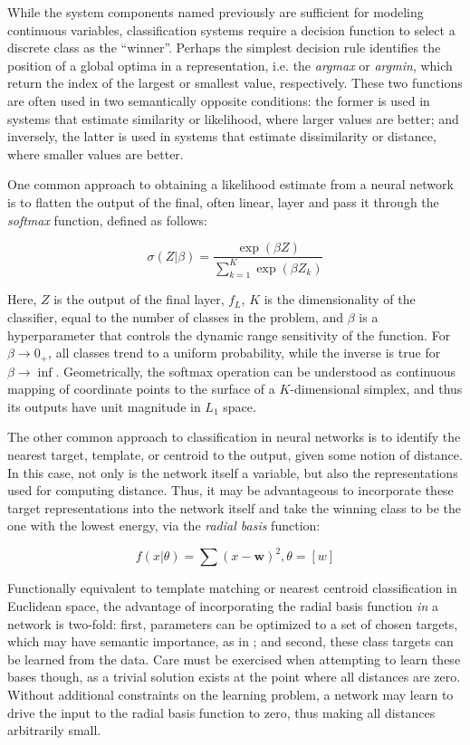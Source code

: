 While the system components named previously are sufficient for modeling continuous variables, classification systems require a decision function to select a discrete class as the ``winner''.
Perhaps the simplest decision rule identifies the position of a global optima in a representation, i.e. the \emph{argmax} or \emph{argmin}, which return the index of the largest or smallest value, respectively.
These two functions are often used in two semantically opposite conditions:
the former is used in systems that estimate similarity or likelihood, where larger values are better;
and inversely, the latter is used in systems that estimate dissimilarity or distance, where smaller values are better.

One common approach to obtaining a likelihood estimate from a neural network is to flatten the output of the final, often linear, layer and pass it through the \emph{softmax} function, defined as follows:

\begin{equation}
\label{eq:softmax}
\sigma(Z | \beta) = \frac{\exp(\beta Z)}{ \sum_{k=1}^{K}\exp{(\beta Z_k)}}
\end{equation}

\noindent Here, $Z$ is the output of the final layer, $f_L$, $K$ is the dimensionality of the classifier, equal to the number of classes in the problem, and $\beta$ is a hyperparameter that controls the dynamic range sensitivity of the function.
For $\beta \to 0_+$, all classes trend to a uniform probability, while the inverse is true for $\beta \to \inf$.
Geometrically, the softmax operation can be understood as continuous mapping of coordinate points to the surface of a $K$-dimensional simplex, and thus its outputs have unit magnitude in $L_1$ space.

The other common approach to classification in neural networks is to identify the nearest target, template, or centroid to the output, given some notion of distance.
In this case, not only is the network itself a variable, but also the representations used for computing distance.
Thus, it may be advantageous to incorporate these target representations into the network itself and take the winning class to be the one with the lowest energy, via the \emph{radial basis} function:

\begin{equation}
f(x | \theta) = \sum(x - \mathbf{w})^2, \theta = [w]
\end{equation}

\noindent Functionally equivalent to template matching or nearest centroid classification in Euclidean space, the advantage of incorporating the radial basis function \emph{in} a network is two-fold:
first, parameters can be optimized to a set of chosen targets, which may have semantic importance, as in \cite{LeCun1998};
and second, these class targets can be learned from the data.
Care must be exercised when attempting to learn these bases though, as a trivial solution exists at the point where all distances are zero.
Without additional constraints on the learning problem, a network may learn to drive the input to the radial basis function to zero, thus making all distances arbitrarily small.


